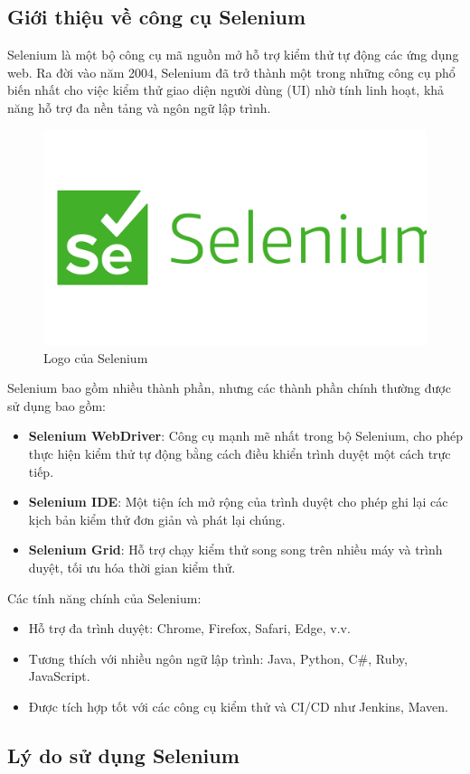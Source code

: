 \subsection{Giới thiệu về công cụ Selenium}

Selenium là một bộ công cụ mã nguồn mở hỗ trợ kiểm thử tự động các ứng dụng web. Ra đời vào năm 2004, Selenium đã trở thành một trong những công cụ phổ biến nhất cho việc kiểm thử giao diện người dùng (UI) nhờ tính linh hoạt, khả năng hỗ trợ đa nền tảng và ngôn ngữ lập trình.

\begin{figure}[H]
    \centering
    \includegraphics[width=0.5\linewidth]{image/selenium.png}
    \caption{Logo của Selenium}
\end{figure}

Selenium bao gồm nhiều thành phần, nhưng các thành phần chính thường được sử dụng bao gồm:
\begin{itemize}
    \item \textbf{Selenium WebDriver}: Công cụ mạnh mẽ nhất trong bộ Selenium, cho phép thực hiện kiểm thử tự động bằng cách điều khiển trình duyệt một cách trực tiếp.
    \item \textbf{Selenium IDE}: Một tiện ích mở rộng của trình duyệt cho phép ghi lại các kịch bản kiểm thử đơn giản và phát lại chúng.
    \item \textbf{Selenium Grid}: Hỗ trợ chạy kiểm thử song song trên nhiều máy và trình duyệt, tối ưu hóa thời gian kiểm thử.
\end{itemize}

Các tính năng chính của Selenium:
\begin{itemize}
    \item Hỗ trợ đa trình duyệt: Chrome, Firefox, Safari, Edge, v.v.
    \item Tương thích với nhiều ngôn ngữ lập trình: Java, Python, C\#, Ruby, JavaScript.
    \item Được tích hợp tốt với các công cụ kiểm thử và CI/CD như Jenkins, Maven.
\end{itemize}

\subsection{Lý do sử dụng Selenium}

